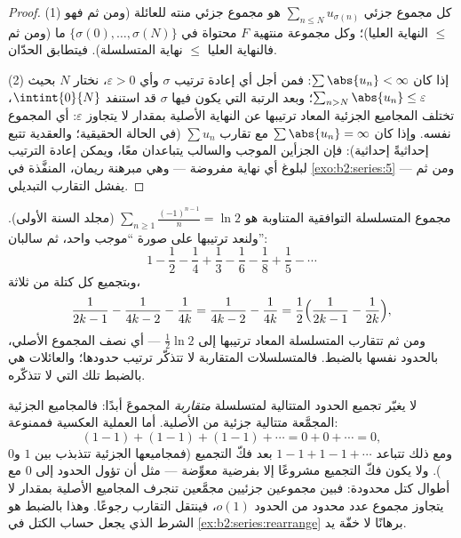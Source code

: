 \begin{proof}
(1) كل مجموع جزئي $\sum_{n \leq N} u_{\sigma(n)}$ هو مجموع جزئي
منته للعائلة (ومن ثم فهو $\leq$ النهاية العليا)؛ وكل مجموعة منتهية $F$
محتواة في $\{\sigma(0), \dots, \sigma(N)\}$ ما (ومن ثم فالنهاية العليا
$\leq$ نهاية المتسلسلة). فيتطابق الحدّان.

(2) إذا كان $\sum\abs{u_n} < \infty$: فمن أجل أي إعادة ترتيب $\sigma$ وأي
$\varepsilon > 0$، نختار $N$ بحيث $\sum_{n > N}\abs{u_n} \leq
\varepsilon$؛ وبعد الرتبة التي يكون فيها $\sigma$ قد استنفد
$\intint{0}{N}$، تختلف المجاميع الجزئية المعاد ترتيبها عن
النهاية الأصلية بمقدار لا يتجاوز $\varepsilon$: أي المجموع نفسه. وإذا كان $\sum
\abs{u_n} = \infty$ مع تقارب $\sum u_n$ (في الحالة الحقيقية؛ والعقدية
تتبع إحداثيةً إحداثية): فإن الجزأين الموجب والسالب يتباعدان
معًا، ويمكن إعادة الترتيب لبلوغ أي نهاية مفروضة
--- وهي مبرهنة ريمان، المنفَّذة في \cref{exo:b2:series:5} ---
ومن ثم يفشل التقارب التبديلي.
\end{proof}

\begin{example}\label{ex:b2:series:rearrange}
مجموع المتسلسلة التوافقية المتناوبة هو
$\sum_{n\geq1}\frac{(-1)^{n-1}}{n} = \ln 2$ (مجلد السنة
الأولى). ولنعد ترتيبها على صورة ``موجب واحد، ثم سالبان'':
\[
1 - \frac12 - \frac14 + \frac13 - \frac16 - \frac18 + \frac15 -
\cdots
\]
وبتجميع كل كتلة من ثلاثة،
\[
\frac{1}{2k-1} - \frac{1}{4k-2} - \frac1{4k}
= \frac{1}{4k-2} - \frac{1}{4k}
= \frac12\Bigl(\frac{1}{2k-1} - \frac1{2k}\Bigr),
\]
ومن ثم تتقارب المتسلسلة المعاد ترتيبها إلى $\frac12\ln 2$ --- أي نصف
المجموع الأصلي، بالحدود نفسها بالضبط. فالمتسلسلات المتقاربة
لا  تتذكّر ترتيب حدودها؛ والعائلات  هي
بالضبط تلك التي لا تتذكّره.
\end{example}

\begin{example}\label{ex:b2:series:grouping}
لا يغيّر تجميع الحدود المتتالية لمتسلسلة \emph{متقاربة}
المجموعَ أبدًا: فالمجاميع الجزئية المجمَّعة متتالية جزئية من
الأصلية. أما العملية العكسية فممنوعة:
\[
(1 - 1) + (1 - 1) + (1 - 1) + \cdots = 0 + 0 + \cdots = 0,
\]
ومع ذلك تتباعد $1 - 1 + 1 - 1 + \cdots$ بعد فكّ التجميع (فمجاميعها
الجزئية تتذبذب بين $1$ و$0$). ولا يكون فكّ التجميع مشروعًا
إلا بفرضية معوِّضة --- مثل أن تؤول الحدود إلى $0$
مع أطوال كتل محدودة: فبين مجموعين جزئيين مجمَّعين تنجرف
المجاميع الأصلية بمقدار لا يتجاوز مجموع عدد محدود من الحدود
$o(1)$، فينتقل التقارب رجوعًا.
وهذا بالضبط هو الشرط الذي يجعل حساب الكتل في
\cref{ex:b2:series:rearrange} برهانًا لا خفّة يد.
\end{example}

